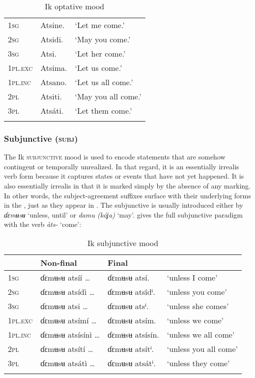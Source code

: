 \begin{table}
\caption{Ik optative mood}
\label{tab:verbs:opt}


\begin{tabularx}{.66\textwidth}{lXl}
\lsptoprule

\textsc{1sg} & Atsine. & ‘Let me come.’\\
\textsc{2sg} & Atsidi. & ‘May you come.’\\
\textsc{3sg} & Atsi. & ‘Let her come.’\\
\textsc{1pl.exc} & Atsima. & ‘Let us come.’\\
\textsc{1pl.inc} & Atsano. & ‘Let us all come.’\\
\textsc{2pl} & Atsiti. & ‘May you all come.’\\
\textsc{3pl} & Atsáti. & ‘Let them come.’\\
\lspbottomrule
\end{tabularx}
\end{table}

\subsubsection{Subjunctive (\textsc{subj})}\label{sec:8.10.4}

The Ik \textsc{subjunctive} mood is used to encode statements that are somehow contingent or temporally unrealized. In that regard, it is an essentially irrealis verb form because it captures states or events that have not yet happened. It is also essentially irrealis in that it is marked simply by the absence of any marking. In other words, the subject-agreement suffixes surface with their underlying forms in the , just as they appear in . The subjunctive is usually introduced either by \textit{ɗɛmʉsʉ} ‘unless, until’ or \textit{damu (kóʝa)} ‘may’.  gives the full subjunctive paradigm with the verb \textit{àts-} ‘come’:


\begin{table}
\caption{Ik subjunctive mood}
\label{tab:verbs:subjct}


\begin{tabularx}{\textwidth}{Xlll}
\lsptoprule

& Non-final & Final & \\
\midrule
\textsc{1sg} & ɗɛmʉsʉ atsíí {\dots} & ɗɛmʉsʉ atsí. & ‘unless I come’\\
\textsc{2sg} & ɗɛmʉsʉ atsídì {\dots} & ɗɛmʉsʉ atsîdⁱ. & ‘unless you come’\\
\textsc{3sg} & ɗɛmʉsʉ atsi {\dots} & ɗɛmʉsʉ atsⁱ. & ‘unless she comes’\\
\textsc{1pl.exc} & ɗɛmʉsʉ atsímí {\dots} & ɗɛmʉsʉ atsím. & ‘unless we come’\\
\textsc{1pl.inc} & ɗɛmʉsʉ atsísínì {\dots} & ɗɛmʉsʉ atsísín. & ‘unless we all come’\\
\textsc{2pl} & ɗɛmʉsʉ atsítí {\dots} & ɗɛmʉsʉ atsítⁱ. & ‘unless you all come’\\
\textsc{3pl} & ɗɛmʉsʉ atsátì {\dots} & ɗɛmʉsʉ atsátⁱ. & ‘unless they come’\\
\lspbottomrule
\end{tabularx}
\end{table}

